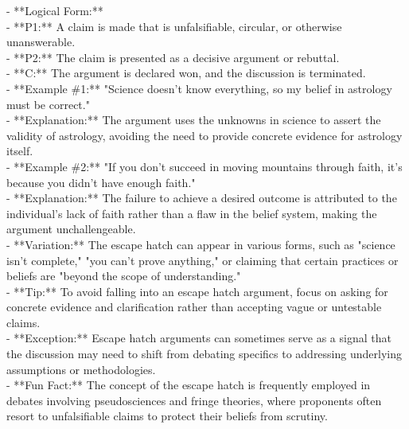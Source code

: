 \documentclass[a4paper,12pt,single,pdftex]{scrbook}
\begin{document}
    
      - **Logical Form:**
    \\

    
        - **P1:** A claim is made that is unfalsifiable, circular, or otherwise unanswerable.
    \\

    
        - **P2:** The claim is presented as a decisive argument or rebuttal.
    \\

    
        - **C:** The argument is declared won, and the discussion is terminated.
    \\

    
      - **Example \#1:** "Science doesn’t know everything, so my belief in astrology must be correct."
    \\

    
      - **Explanation:** The argument uses the unknowns in science to assert the validity of astrology, avoiding the need to provide concrete evidence for astrology itself.
    \\

    
      - **Example \#2:** "If you don’t succeed in moving mountains through faith, it’s because you didn’t have enough faith."
    \\

    
      - **Explanation:** The failure to achieve a desired outcome is attributed to the individual's lack of faith rather than a flaw in the belief system, making the argument unchallengeable.
    \\

    
      - **Variation:** The escape hatch can appear in various forms, such as "science isn’t complete," "you can’t prove anything," or claiming that certain practices or beliefs are "beyond the scope of understanding."
    \\

    
      - **Tip:** To avoid falling into an escape hatch argument, focus on asking for concrete evidence and clarification rather than accepting vague or untestable claims.
    \\

    
      - **Exception:** Escape hatch arguments can sometimes serve as a signal that the discussion may need to shift from debating specifics to addressing underlying assumptions or methodologies.
    \\

    
      - **Fun Fact:** The concept of the escape hatch is frequently employed in debates involving pseudosciences and fringe theories, where proponents often resort to unfalsifiable claims to protect their beliefs from scrutiny.
    \\
\end{document}
